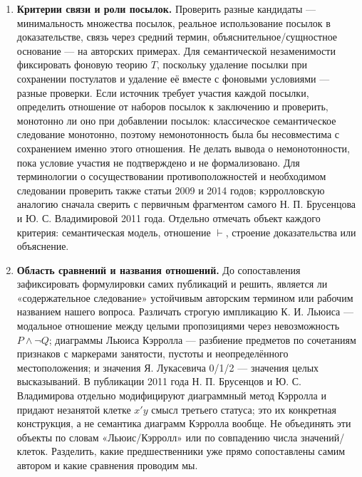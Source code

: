 \documentclass[12pt,a4paper]{article}
\begin{document}
\begin{enumerate}
\item \textbf{Критерии связи и роли посылок.} Проверить разные кандидаты — минимальность множества посылок, реальное использование посылок в доказательстве, связь через средний термин, объяснительное/сущностное основание — на авторских примерах. Для семантической незаменимости фиксировать фоновую теорию \(T\), поскольку удаление посылки при сохранении постулатов и удаление её вместе с фоновыми условиями — разные проверки. Если источник требует участия каждой посылки, определить отношение от наборов посылок к заключению и проверить, монотонно ли оно при добавлении посылок: классическое семантическое следование монотонно, поэтому немонотонность была бы несовместима с сохранением именно этого отношения. Не делать вывода о немонотонности, пока условие участия не подтверждено и не формализовано. Для терминологии о сосуществовании противоположностей и необходимом следовании проверить также статьи 2009 и 2014 годов; кэрролловскую аналогию сначала сверить с первичным фрагментом самого Н. П. Брусенцова и Ю. С. Владимировой 2011 года. Отдельно отмечать объект каждого критерия: семантическая модель, отношение \(\vdash\), строение доказательства или объяснение.
\item \textbf{Область сравнений и названия отношений.} До сопоставления зафиксировать формулировки самих публикаций и решить, является ли «содержательное следование» устойчивым авторским термином или рабочим названием нашего вопроса. Различать строгую импликацию К. И. Льюиса — модальное отношение между целыми пропозициями через невозможность \(P\land\neg Q\); диаграммы Льюиса Кэрролла — разбиение предметов по сочетаниям признаков с маркерами занятости, пустоты и неопределённого местоположения; и значения Я. Лукасевича 0/1/2 — значения целых высказываний. В публикации 2011 года Н. П. Брусенцов и Ю. С. Владимирова отдельно модифицируют диаграммный метод Кэрролла и придают незанятой клетке \(x'y\) смысл третьего статуса; это их конкретная конструкция, а не семантика диаграмм Кэрролла вообще. Не объединять эти объекты по словам «Льюис/Кэрролл» или по совпадению числа значений/клеток. Разделить, какие предшественники уже прямо сопоставлены самим автором и какие сравнения проводим мы.

\end{enumerate}
\end{document}
